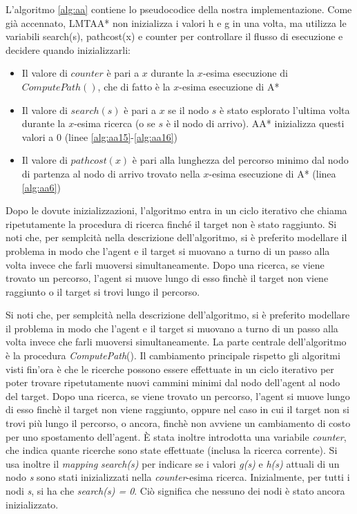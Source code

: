 \documentclass[12pt]{book}
\begin{document}
\par{L'algoritmo \ref{alg:aa} contiene lo pseudocodice della nostra implementazione. Come gi\`a accennato, LMTAA* non inizializza i valori h e g in una volta, ma utilizza le variabili search(s), pathcost(x) e counter per controllare il flusso di esecuzione e decidere quando inizializzarli:
\begin{itemize}
\item Il valore di $counter$ \`e pari a $x$ durante la $x$-esima esecuzione di $ComputePath()$, che di fatto \`e la $x$-esima esecuzione di A*
\item Il valore di $search(s)$ \`e pari a $x$ se il nodo $s$ \`e stato esplorato l'ultima volta durante la $x$-esima ricerca (o se $s$ \`e il nodo di arrivo). AA* inizializza questi valori a 0 (linee \ref{alg:aa15}-\ref{alg:aa16})
\item Il valore di $pathcost(x)$ \`e pari alla lunghezza del percorso minimo dal nodo di partenza al nodo di arrivo trovato nella $x$-esima esecuzione di A* (linea \ref{alg:aa6})
\end{itemize}
 }
\par{Dopo le dovute inizializzazioni, l'algoritmo entra in un ciclo iterativo che chiama ripetutamente la procedura di ricerca finch\'e il target non \`e stato raggiunto. Si noti che, per semplcit\`a nella descrizione dell'algoritmo, si \`e preferito modellare il problema in modo che l'agent e il target si muovano a turno di un passo alla volta invece che farli muoversi simultaneamente. Dopo una ricerca, se viene trovato un percorso, l'agent si muove lungo di esso finch\`e il target non viene raggiunto o il target si trovi lungo il percorso.}
\iffalse
\par{Si noti che, per semplcit\`a nella descrizione dell'algoritmo, si \`e preferito modellare il problema in modo che l'agent e il target si muovano a turno di un passo alla volta invece che farli muoversi simultaneamente. La parte centrale dell'algoritmo \`e la procedura \emph{ComputePath}(). Il cambiamento principale rispetto gli algoritmi visti fin'ora \`e che le ricerche possono essere effettuate in un ciclo iterativo per poter trovare ripetutamente nuovi cammini minimi dal nodo dell'agent al nodo del target. Dopo una ricerca, se viene trovato un percorso, l'agent si muove lungo di esso finch\`e il target non viene raggiunto, oppure nel caso in cui il target non si trovi pi\`u lungo il percorso, o ancora, finch\`e non avviene un cambiamento di costo per uno spostamento dell'agent. \`E stata inoltre introdotta una variabile \emph{counter}, che indica quante ricerche sono state effettuate (inclusa la ricerca corrente). Si usa inoltre il \emph{mapping} \emph{search(s)} per indicare se i valori \emph{g(s)} e \emph{h(s)} attuali di un nodo \emph{s}  sono stati inizializzati nella \emph{counter}-esima ricerca. Inizialmente, per tutti i nodi \emph{s}, si ha che \emph{search(s) = 0}. Ci\`o significa che nessuno dei nodi \`e stato ancora inizializzato.}
\end{document}
